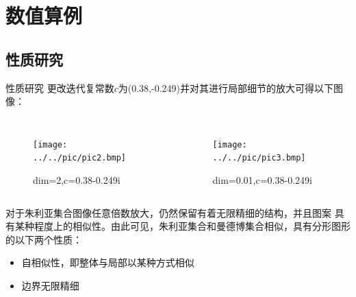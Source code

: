 \documentclass[8pt,c,compress,UTF8]{beamer}
\begin{document}
\section{数值算例}
\subsection{性质研究}
\begin{frame}{性质研究}
更改迭代复常数$c$为(0.38,-0.249)并对其进行局部细节的放大可得以下图像：
\begin{columns}
    \begin{figure}[H] 
    \centering 
    \texttt{[image: ../../pic/pic2.bmp]} 
    \caption{dim=2,c=0.38-0.249i} 
    \end{figure}
    \begin{figure}[H] 
    \centering 
    \texttt{[image: ../../pic/pic3.bmp]} 
    \caption{dim=0.01,c=0.38-0.249i} 
    \end{figure}
\end{columns}
对于朱利亚集合图像任意倍数放大，仍然保留有着无限精细的结构，并且图案
具有某种程度上的相似性。由此可见，朱利亚集合和曼德博集合相似，具有分形图形的以下两个性质：
\begin{itemize}
    \item 自相似性，即整体与局部以某种方式相似
    \item 边界无限精细
\end{itemize}
\end{frame}
\end{document}
